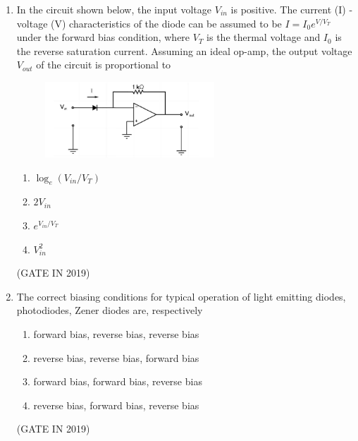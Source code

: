 \documentclass[journal]{IEEEtran}
\begin{document}
\begin{enumerate}
\item In the circuit shown below, the input voltage $V_{in}$ is positive. The current (I) - voltage (V) characteristics of the diode can be assumed to be $I = I_0 e^{V/V_T}$ under the forward bias condition, where $V_T$ is the thermal voltage and $I_0$ is the reverse saturation current. Assuming an ideal op-amp, the output voltage $V_{out}$ of the circuit is proportional to
\begin{figure}[H]
    \centering
    \includegraphics[width=0.6\textwidth]{3.png}
    \caption{}
    \label{fig:fig3}
\end{figure}
\begin{multicols}{4}
\begin{enumerate}
\item $\log_e(V_{in}/V_T)$
\item $2V_{in}$
\item $e^{V_{in}/V_T}$
\item $V^2_{in}$
\end{enumerate}
\end{multicols} \hfill(GATE IN 2019)

\item The correct biasing conditions for typical operation of light emitting diodes, photodiodes, Zener diodes are, respectively

\begin{enumerate}
\item forward bias, reverse bias, reverse bias
\item reverse bias, reverse bias, forward bias
\item forward bias, forward bias, reverse bias
\item reverse bias, forward bias, reverse bias
\end{enumerate}
 \hfill(GATE IN 2019)


\end{enumerate}
\end{document}
